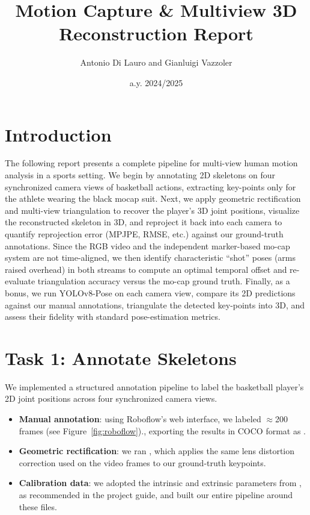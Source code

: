 \documentclass[11pt,a4paper]{article}
\title{Motion Capture \& Multiview 3D Reconstruction Report}
\author{Antonio Di Lauro and Gianluigi Vazzoler}
\date{a.y. 2024/2025}
\begin{document}
\maketitle

\section*{Introduction}
The following report presents a complete pipeline for multi-view human motion analysis in a sports setting. We begin by annotating 2D skeletons on four synchronized camera views of basketball actions, extracting key-points only for the athlete wearing the black mocap suit. Next, we apply geometric rectification and multi-view triangulation to recover the player’s 3D joint positions, visualize the reconstructed skeleton in 3D, and reproject it back into each camera to quantify reprojection error (MPJPE, RMSE, etc.) against our ground-truth annotations. Since the RGB video and the independent marker-based mo-cap system are not time-aligned, we then identify characteristic “shot” poses (arms raised overhead) in both streams to compute an optimal temporal offset and re-evaluate triangulation accuracy versus the mo-cap ground truth. Finally, as a bonus, we run YOLOv8-Pose on each camera view, compare its 2D predictions against our manual annotations, triangulate the detected key-points into 3D, and assess their fidelity with standard pose-estimation metrics.

\section*{Task 1: Annotate Skeletons}
We implemented a structured annotation pipeline to label the basketball player’s 2D joint positions across four synchronized camera views.  

\begin{itemize}
  \item \textbf{Manual annotation}: using Roboflow’s web interface, we labeled $\approx$200 frames (see Figure~\ref{fig:roboflow})., exporting the results in COCO format as .
  \item \textbf{Geometric rectification}: we ran , which applies the same lens distortion correction used on the video frames to our ground-truth keypoints.
  \item \textbf{Calibration data}: we adopted the intrinsic and extrinsic parameters from , as recommended in the project guide, and built our entire pipeline around these files.
\end{itemize}
\end{document}
